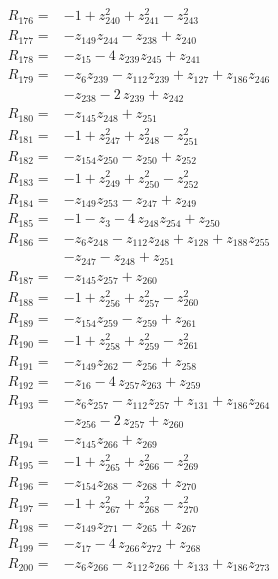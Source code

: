 \begin{align*}
R_{176}={}&-1 +z_{240}^{2} +z_{241}^{2} -z_{243}^{2}\\[2pt]
R_{177}={}&-z_{149}z_{244} -z_{238} +z_{240}\\[2pt]
R_{178}={}&-z_{15} -4\,z_{239}z_{245} +z_{241}\\[2pt]
R_{179}={}&-z_{6}z_{239} -z_{112}z_{239} +z_{127} +z_{186}z_{246}\\
&-z_{238} -2\,z_{239} +z_{242}\\[2pt]
R_{180}={}&-z_{145}z_{248} +z_{251}\\[2pt]
R_{181}={}&-1 +z_{247}^{2} +z_{248}^{2} -z_{251}^{2}\\[2pt]
R_{182}={}&-z_{154}z_{250} -z_{250} +z_{252}\\[2pt]
R_{183}={}&-1 +z_{249}^{2} +z_{250}^{2} -z_{252}^{2}\\[2pt]
R_{184}={}&-z_{149}z_{253} -z_{247} +z_{249}\\[2pt]
R_{185}={}&-1 -z_{3} -4\,z_{248}z_{254} +z_{250}\\[2pt]
R_{186}={}&-z_{6}z_{248} -z_{112}z_{248} +z_{128} +z_{188}z_{255}\\
&-z_{247} -z_{248} +z_{251}\\[2pt]
R_{187}={}&-z_{145}z_{257} +z_{260}\\[2pt]
R_{188}={}&-1 +z_{256}^{2} +z_{257}^{2} -z_{260}^{2}\\[2pt]
R_{189}={}&-z_{154}z_{259} -z_{259} +z_{261}\\[2pt]
R_{190}={}&-1 +z_{258}^{2} +z_{259}^{2} -z_{261}^{2}\\[2pt]
R_{191}={}&-z_{149}z_{262} -z_{256} +z_{258}\\[2pt]
R_{192}={}&-z_{16} -4\,z_{257}z_{263} +z_{259}\\[2pt]
R_{193}={}&-z_{6}z_{257} -z_{112}z_{257} +z_{131} +z_{186}z_{264}\\
&-z_{256} -2\,z_{257} +z_{260}\\[2pt]
R_{194}={}&-z_{145}z_{266} +z_{269}\\[2pt]
R_{195}={}&-1 +z_{265}^{2} +z_{266}^{2} -z_{269}^{2}\\[2pt]
R_{196}={}&-z_{154}z_{268} -z_{268} +z_{270}\\[2pt]
R_{197}={}&-1 +z_{267}^{2} +z_{268}^{2} -z_{270}^{2}\\[2pt]
R_{198}={}&-z_{149}z_{271} -z_{265} +z_{267}\\[2pt]
R_{199}={}&-z_{17} -4\,z_{266}z_{272} +z_{268}\\[2pt]
R_{200}={}&-z_{6}z_{266} -z_{112}z_{266} +z_{133} +z_{186}z_{273}\\

\end{align*}
